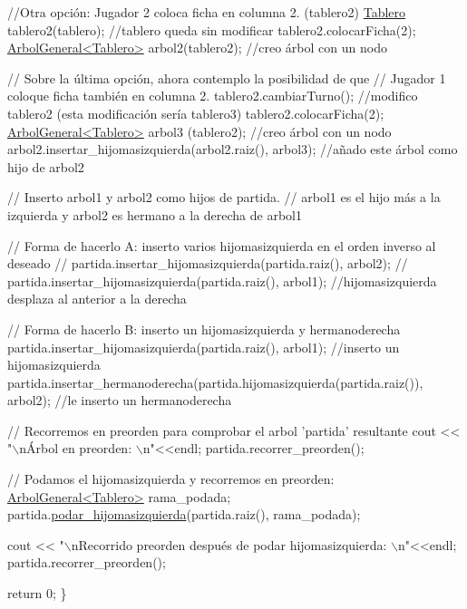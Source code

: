 \begin{DoxyCode}
    \textcolor{comment}{//Otra opción: Jugador 2 coloca ficha en columna 2. (tablero2)}
    \hyperlink{classTablero}{Tablero} tablero2(tablero);          \textcolor{comment}{//tablero queda sin modificar}
    tablero2.colocarFicha(2);
    \hyperlink{classArbolGeneral}{ArbolGeneral<Tablero>} arbol2(tablero2);   \textcolor{comment}{//creo árbol con un nodo}

    \textcolor{comment}{// Sobre la última opción, ahora contemplo la posibilidad de que }
    \textcolor{comment}{//  Jugador 1 coloque ficha también en columna 2. }
    tablero2.cambiarTurno();          \textcolor{comment}{//modifico tablero2 (esta modificación sería tablero3)}
    tablero2.colocarFicha(2); 
    \hyperlink{classArbolGeneral}{ArbolGeneral<Tablero>} arbol3 (tablero2);  \textcolor{comment}{//creo árbol con un nodo}
    arbol2.insertar\_hijomasizquierda(arbol2.raiz(), arbol3);  \textcolor{comment}{//añado este árbol como hijo de arbol2}

    \textcolor{comment}{// Inserto arbol1 y arbol2 como hijos de partida. }
    \textcolor{comment}{// arbol1 es el hijo más a la izquierda y arbol2 es hermano a la derecha de arbol1}
  
    \textcolor{comment}{//  Forma de hacerlo A: inserto varios hijomasizquierda en el orden inverso al deseado}
    \textcolor{comment}{//  partida.insertar\_hijomasizquierda(partida.raiz(), arbol2);}
    \textcolor{comment}{//  partida.insertar\_hijomasizquierda(partida.raiz(), arbol1);  //hijomasizquierda desplaza al anterior
       a la derecha}
  
    \textcolor{comment}{// Forma de hacerlo B: inserto un hijomasizquierda y hermanoderecha}
    partida.insertar\_hijomasizquierda(partida.raiz(), arbol1);              \textcolor{comment}{//inserto un hijomasizquierda}
    partida.insertar\_hermanoderecha(partida.hijomasizquierda(partida.raiz()), arbol2);  \textcolor{comment}{//le inserto un
       hermanoderecha}
    

    \textcolor{comment}{// Recorremos en preorden para comprobar el arbol 'partida' resultante}
    cout << \textcolor{stringliteral}{"\(\backslash\)nÁrbol en preorden: \(\backslash\)n"}<<endl; 
    partida.recorrer\_preorden();

    \textcolor{comment}{// Podamos el hijomasizquierda y recorremos en preorden: }
    \hyperlink{classArbolGeneral}{ArbolGeneral<Tablero>} rama\_podada;
    partida.\hyperlink{classArbolGeneral_a7f2fa2d9be4af4b7be1c334819a04c39}{podar\_hijomasizquierda}(partida.raiz(), rama\_podada);

    cout << \textcolor{stringliteral}{"\(\backslash\)nRecorrido preorden después de podar hijomasizquierda: \(\backslash\)n"}<<endl; 
    partida.recorrer\_preorden();

    \textcolor{keywordflow}{return} 0;
\}
\end{DoxyCode}


